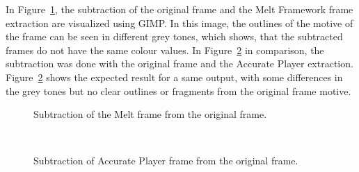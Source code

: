 \documentclass[../MasterThesis.tex]{subfiles}
\begin{document}
\vspace*{2em}
In Figure~\ref{figure:oVSmelt}, the subtraction of the original frame and the Melt Framework frame extraction are visualized using GIMP. In this image, the outlines of the motive of the frame can be seen in different grey tones, which shows, that the subtracted frames do not have the same colour values.
In Figure~\ref{figure:oVSap} in comparison, the subtraction was done with the original frame and the Accurate Player extraction. Figure~\ref{figure:oVSap} shows the expected result for a same output, with some differences in the grey tones but no clear outlines or fragments from the original frame motive.



\begin{minipage}{0.48\textwidth}
	\begin{figure}[H]
		\begin{center}
			\caption[Subtraction of the Melt frame from the original frame.]{Subtraction of the Melt frame from the original frame.}
			\label{figure:oVSmelt}
		\end{center}
	\end{figure}
\end{minipage}\begin{minipage}{0.04\textwidth}
	\ 
\end{minipage}\begin{minipage}{0.48\textwidth}
	\begin{figure}[H]
		\begin{center}
			\caption[Subtraction of Accurate Player frame from the original frame.]{Subtraction of Accurate Player frame from the original frame.}
			\label{figure:oVSap}
		\end{center}
	\end{figure}
\end{minipage}





\end{document}
